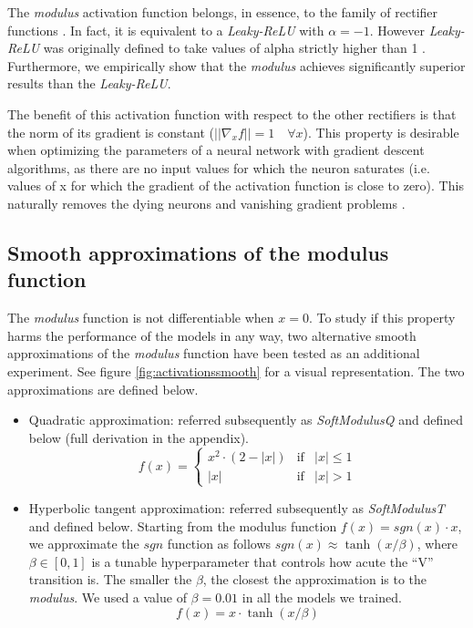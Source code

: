 \documentclass[authoryear]{elsarticle}
\begin{document}
The \textit{modulus} activation function belongs, in essence, to the family of rectifier functions \citep{glorot2015} . In fact, it is equivalent to a \textit{Leaky-ReLU} with $\alpha=-1$. However \textit{Leaky-ReLU} was originally defined to take values of alpha strictly higher than 1 \citep{xu2015}. Furthermore, we empirically show that the \textit{modulus} achieves significantly superior results than the \textit{Leaky-ReLU}.

The benefit of this activation function with respect to the other rectifiers is that the norm of its gradient is constant ($||\nabla_x f|| = 1 \quad \forall x$). This property is desirable when optimizing the parameters of a neural network with gradient descent algorithms, as there are no input values for which the neuron saturates \citep{glorot2010} (i.e. values of x for which the gradient of the activation function is close to zero). This naturally removes the dying neurons \citep{lu2020} and vanishing gradient problems \citep{pascanu13, hochreiter1998, Hochreiter2001}.

\subsection{Smooth approximations of the modulus function}
The \textit{modulus} function is not differentiable when $x=0$. To study if this property harms the performance of the models in any way, two alternative smooth approximations of the \textit{modulus} function have been tested as an additional experiment. See figure \ref{fig:activationssmooth} for a visual representation. The two approximations are defined below.
\begin{itemize}
	\item Quadratic approximation: referred subsequently as \textit{SoftModulusQ} and defined below (full derivation in the appendix).
	$$
	f(x)= \left\{ \begin{array}{lcc}
	x^2 \cdot (2-|x|) &  \text{if} & |x| \leq 1 \\
	|x| &   \text{if}  & |x| > 1
	\end{array}
	\right.
	$$
	\item Hyperbolic tangent approximation: referred subsequently as \textit{SoftModulusT} and defined below. Starting from the modulus function $f(x)=sgn(x)\cdot x$, we approximate the $sgn$ function as follows $sgn(x) \approx \tanh(x/\beta)$, where $\beta \in [0, 1]$ is a tunable hyperparameter that controls how acute the ``V'' transition is. The smaller the $\beta$, the closest the approximation is to the \textit{modulus}. We used a value of $\beta=0.01$ in all the models we trained.
	$$f(x) = x \cdot \tanh(x/\beta)$$
\end{itemize}
\end{document}
